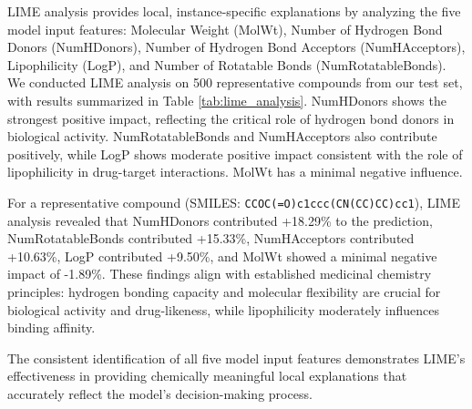 \documentclass[preprint,12pt]{elsarticle}
\begin{document}
LIME analysis provides local, instance-specific explanations by analyzing the five model input features: Molecular Weight (MolWt), Number of Hydrogen Bond Donors (NumHDonors), Number of Hydrogen Bond Acceptors (NumHAcceptors), Lipophilicity (LogP), and Number of Rotatable Bonds (NumRotatableBonds). We conducted LIME analysis on 500 representative compounds from our test set, with results summarized in Table \ref{tab:lime_analysis}. NumHDonors shows the strongest positive impact, reflecting the critical role of hydrogen bond donors in biological activity. NumRotatableBonds and NumHAcceptors also contribute positively, while LogP shows moderate positive impact consistent with the role of lipophilicity in drug-target interactions. MolWt has a minimal negative influence.


\begin{table}[H]
\centering
\caption{LIME Feature Impact Analysis for Model Input Features}
\label{tab:lime_analysis}
\end{table}

For a representative compound (SMILES: \texttt{CCOC(=O)c1ccc(CN(CC)CC)cc1}), LIME analysis revealed that NumHDonors contributed +18.29\% to the prediction, NumRotatableBonds contributed +15.33\%, NumHAcceptors contributed +10.63\%, LogP contributed +9.50\%, and MolWt showed a minimal negative impact of -1.89\%. These findings align with established medicinal chemistry principles: hydrogen bonding capacity and molecular flexibility are crucial for biological activity and drug-likeness, while lipophilicity moderately influences binding affinity.

The consistent identification of all five model input features demonstrates LIME's effectiveness in providing chemically meaningful local explanations that accurately reflect the model's decision-making process.
\end{document}
